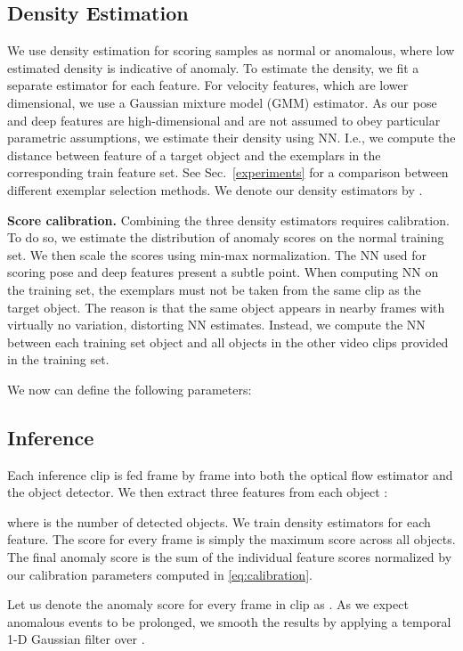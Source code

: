 \documentclass[10pt,twocolumn,letterpaper]{article}
\begin{document}
\subsection{Density Estimation}
\label{met:density}
We use density estimation for scoring samples as normal or anomalous, where low estimated density is indicative of anomaly. To estimate the density, we fit a separate estimator for each feature. For velocity features, which are lower dimensional, we use a Gaussian mixture model (GMM) estimator. As our pose and deep features are high-dimensional and are not assumed to obey particular parametric assumptions, we estimate their density using NN. I.e., we compute the  distance between feature  of a target object and the  exemplars in the corresponding train feature set. See Sec.~\ref{experiments} for a comparison between different exemplar selection methods. We denote our density estimators by .

\textbf{Score calibration.}  Combining the three density estimators requires calibration. To do so, we estimate the distribution of anomaly scores on the normal training set. We then scale the scores using min-max normalization. The NN used for scoring pose and deep features present a subtle point. When computing NN on the training set, the exemplars must not be taken from the same clip as the target object. The reason is that the same object appears in nearby frames with virtually no variation, distorting NN estimates. Instead, we compute the NN between each training set object and all objects in the other video clips provided in the training set.

We now can define the following parameters:


\subsection{Inference} Each inference clip  is fed frame by frame into both the optical flow estimator and the object detector. We then extract three features from each object :

where  is the number of detected objects. We train density estimators for each feature. The score for every frame is simply the maximum score across all objects. The final anomaly score is the sum of the individual feature scores normalized by our calibration parameters computed in \cref{eq:calibration}.

Let us denote the anomaly score for every frame in clip  as . As we expect anomalous events to be prolonged, we smooth the results by applying a temporal 1-D Gaussian filter over .
\end{document}
